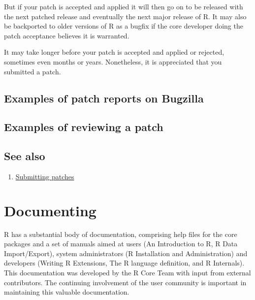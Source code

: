 \documentclass[
]{book}
\providecommand{\tightlist}{%
  \setlength{\itemsep}{0pt}\setlength{\parskip}{0pt}}
\begin{document}
But if your patch is accepted and applied it will then go on to be released with the next patched release and eventually the next major release of R. It may also be backported to older versions of R as a bugfix if the core developer doing the patch acceptance believes it is warranted.

It may take longer before your patch is accepted and applied or rejected, sometimes even months or years. Nonetheless, it is appreciated that you submitted a patch.

\hypertarget{examples-of-patch-reports-on-bugzilla}{%
\section{Examples of patch reports on Bugzilla}\label{examples-of-patch-reports-on-bugzilla}}

\hypertarget{examples-of-reviewing-a-patch}{%
\section{Examples of reviewing a patch}\label{examples-of-reviewing-a-patch}}

\hypertarget{see-also-4}{%
\section{See also}\label{see-also-4}}

\begin{enumerate}
\def\labelenumi{\arabic{enumi}.}
\tightlist
\item
  \href{https://www.r-project.org/bugs.html\#how-to-submit-patches}{Submitting patches}
\end{enumerate}

\hypertarget{Doc}{%
\chapter{Documenting}\label{Doc}}

R has a substantial body of documentation, comprising help files for the core packages and a set of manuals aimed at users (An Introduction to R, R Data Import/Export), system administrators (R Installation and Administration) and developers (Writing R Extensions, The R language definition, and R Internals). This documentation was developed by the R Core Team with input from external contributors. The continuing involvement of the user community is important in maintaining this valuable documentation.
\end{document}
